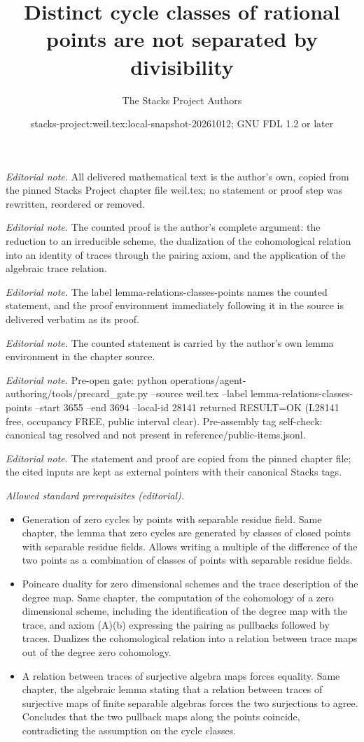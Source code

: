 \documentclass[10pt,a4paper]{amsart}
\title{Distinct cycle classes of rational points are not separated by divisibility}
\author{The Stacks Project Authors}
\date{stacks-project:weil.tex:local-snapshot-20261012; GNU FDL 1.2 or later}
\theoremstyle{plain}
\theoremstyle{definition}
\theoremstyle{remark}
\numberwithin{equation}{subsection}
\begin{document}
\maketitle
\noindent\textit{Editorial note.} All delivered mathematical text is the author's own, copied from the pinned Stacks Project chapter file weil.tex; no statement or proof step was rewritten, reordered or removed.\par\medskip
\noindent\textit{Editorial note.} The counted proof is the author's complete argument: the reduction to an irreducible scheme, the dualization of the cohomological relation into an identity of traces through the pairing axiom, and the application of the algebraic trace relation.\par\medskip
\noindent\textit{Editorial note.} The label lemma-relations-classes-points names the counted statement, and the proof environment immediately following it in the source is delivered verbatim as its proof.\par\medskip
\noindent\textit{Editorial note.} The counted statement is carried by the author's own lemma environment in the chapter source.\par\medskip
\noindent\textit{Editorial note.} Pre-open gate: python operations/agent-authoring/tools/precard\_gate.py --source weil.tex --label lemma-relations-classes-points --start 3655 --end 3694 --local-id 28141 returned RESULT=OK (L28141 free, occupancy FREE, public interval clear). Pre-assembly tag self-check: canonical tag resolved and not present in reference/public-items.jsonl.\par\medskip
\noindent\textit{Editorial note.} The statement and proof are copied from the pinned chapter file; the cited inputs are kept as external pointers with their canonical Stacks tags.\par\medskip
\noindent\textit{Allowed standard prerequisites (editorial).}\begin{itemize}
\item Generation of zero cycles by points with separable residue field. Same chapter, the lemma that zero cycles are generated by classes of closed points with separable residue fields. Allows writing a multiple of the difference of the two points as a combination of classes of points with separable residue fields.
\item Poincare duality for zero dimensional schemes and the trace description of the degree map. Same chapter, the computation of the cohomology of a zero dimensional scheme, including the identification of the degree map with the trace, and axiom (A)(b) expressing the pairing as pullbacks followed by traces. Dualizes the cohomological relation into a relation between trace maps out of the degree zero cohomology.
\item A relation between traces of surjective algebra maps forces equality. Same chapter, the algebraic lemma stating that a relation between traces of surjective maps of finite separable algebras forces the two surjections to agree. Concludes that the two pullback maps along the points coincide, contradicting the assumption on the cycle classes.
\end{itemize}\medskip
\end{document}
